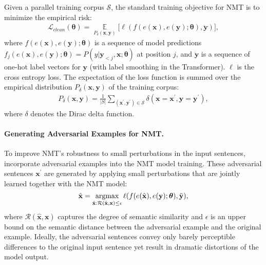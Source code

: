 \documentclass[11pt,a4paper]{article}
\def\argmax{\mathop{\rm argmax}}\def\argmin{\mathop{\rm argmin}}\def\max{\mathop{\rm max}}
\def\bx{\mathbf{x}} \def\bxp{\mathbf{x}^{\prime}} \def\bxpp{\mathbf{x}^{\prime\prime}} \def\tbx{\tilde{\mathbf{x}}} \def\hbx{\hat{\mathbf{x}}} \def\ex{e(\mathbf{x})}
\def\by{\mathbf{y}} \def\byp{\mathbf{y}^{\prime}} \def\bypp{\mathbf{y}^{\prime\prime}} \def\tby{\tilde{\mathbf{y}}} \def\hby{\hat{\mathbf{y}}} \def\ey{e(\mathbf{y})}
\begin{document}
Given a parallel training corpus $\mathcal{S}$, the standard training objective for NMT is to minimize the empirical risk:
\begin{eqnarray}
\mathcal{L}_{clean}(\bm{\theta}) = \mathop{\mathbb{E}}\limits_{P_{\delta}(\bx, \by)} \lbrack \ell(f(\ex, \ey;\bm{\theta}), \ddot{\by}) \rbrack,
\label{eq:loss_clean}
\end{eqnarray}
where $f(\ex, \ey;\bm{\theta})$ is a sequence of model predictions $f_{j}(\ex, \ey;\bm{\theta}) = P(y|\mathbf{y}_{< j}, \mathbf{x};\bm{\theta}) $ at position $j$, and $\ddot{\by}$ is a sequence of one-hot label vectors for $\by$ (with label smoothing in the Transformer). $\ell$ is the cross entropy loss. The expectation of the loss function is summed over the empirical distribution $P_{\delta}(\bx,\by)$ of the training corpus:
\begin{eqnarray}
P_{\delta}(\bx, \by)  = \frac{1}{\vert S \vert}{\sum_{(\bxp, \byp) \in \mathcal{S}} \delta (\bx=\bxp, \by=\byp)},
\end{eqnarray}
where $\delta$ denotes the Dirac delta function.
 
\paragraph{Generating Adversarial Examples for NMT.} 
To improve NMT's robustness to small perturbations in the input sentences, \citet{Cheng:19} incorporate adversarial examples into the NMT model training. These adversarial sentences $\bx^{\prime}$ are generated by applying small perturbations that are jointly learned together with the NMT model:
\begin{equation}
    \hbx = \argmax_{\hbx : \mathcal{R}(\hbx, \bx) \leq \epsilon} \ell(f(e(\hat{\bx}), \ey;\bm{\theta}), \ddot{\by}), \label{eq:adv_space}
\end{equation}
where $\mathcal{R}(\hbx, \bx)$ captures the degree of semantic similarity and
$\epsilon$ is an upper bound on the semantic distance between the adversarial example and the original example. Ideally, the adversarial sentences convey only barely perceptible differences to the original input sentence yet result in dramatic distortions of the model output.
\end{document}
